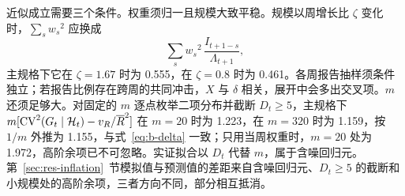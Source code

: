 近似成立需要三个条件。权重须归一且规模大致平稳。规模以周增长比 $\zeta$ 变化时，$\sum_s {w_s}^2$ 应换成
\begin{equation}
  \sum_s {w_s}^2\,\frac{I_{t+1-s}}{\Lambda_{t+1}},
\end{equation}
主规格下它在 $\zeta=1.67$ 时为 0.555，在 $\zeta=0.8$ 时为 0.461。各周报告抽样须条件独立；若报告比例存在跨周的共同冲击，$X$ 与 $\delta$ 相关，展开中会多出交叉项。$m$ 还须足够大。对固定的 $m$ 逐点枚举二项分布并截断 $D_t\geq5$，主规格下 $m[\operatorname{CV}^2(G_t\mid\mathcal H_t)-v_R/\overline{R}^2]$ 在 $m=20$ 时为 1.223，在 $m=320$ 时为 1.159，按 $1/m$ 外推为 1.155，与式~\eqref{eq:b-delta} 一致；只用当周权重时，$m=20$ 处为 1.972，高阶余项已不可忽略。实证拟合以 $D_t$ 代替 $m$，属于含噪回归元。第~\ref{sec:res-inflation}~节模拟值与预测值的差距来自含噪回归元、$D_t\geq5$ 的截断和小规模处的高阶余项，三者方向不同，部分相互抵消。
